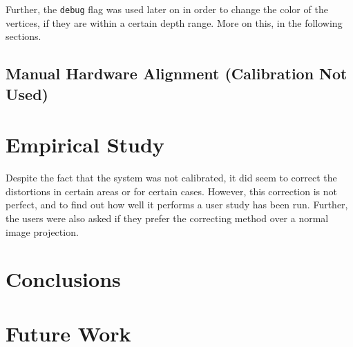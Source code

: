 \documentclass[]{article}
\begin{document}
Further, the \verb|debug| flag was used later on in order to change the color of the vertices, if they are within a certain depth range. More on this, in the following sections.


\subsection{Manual Hardware Alignment (Calibration Not Used)}


\section{Empirical Study}

Despite the fact that the system was not calibrated, it did seem to correct the distortions in certain areas or for certain cases. However, this correction is not perfect, and to find out how well it performs a user study has been run. Further, the users were also asked if they prefer the correcting method over a normal image projection.


\section{Conclusions}
\section{Future Work}

\newpage


\end{document}
